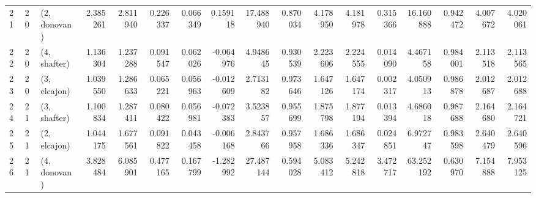 \begin{tabular}{lllrrrrrrrrrrrrrr}
21 &    20 &  (2, donovan) &  2.385261 &  2.811940 &   0.226337 &  0.066349 &  0.159118 &  17.488940 &  0.870034 &   4.178950 &  4.181978 &  0.315366 &  16.160888 &  0.942472 &  4.007672 &  4.020061 \\
22 &    20 &  (4, shafter) &  1.136304 &  1.237288 &   0.091547 &  0.062026 & -0.064976 &   4.948645 &  0.930539 &   2.223606 &  2.224555 &  0.014090 &   4.467158 &  0.984001 &  2.113518 &  2.113565 \\
23 &    20 &  (3, elcajon) &  1.039550 &  1.286633 &   0.065221 &  0.056963 & -0.012609 &   2.713182 &  0.973646 &   1.647126 &  1.647174 &  0.002317 &   4.050913 &  0.986878 &  2.012687 &  2.012688 \\
24 &    21 &  (3, shafter) &  1.100834 &  1.287411 &   0.080422 &  0.056981 & -0.072383 &   3.523857 &  0.955699 &   1.875798 &  1.877194 &  0.013394 &   4.686018 &  0.987688 &  2.164680 &  2.164721 \\
25 &    21 &  (2, elcajon) &  1.044175 &  1.677561 &   0.091822 &  0.043458 & -0.006168 &   2.843766 &  0.957958 &   1.686336 &  1.686347 &  0.024851 &   6.972747 &  0.983598 &  2.640479 &  2.640596 \\
26 &    21 &  (4, donovan) &  3.828484 &  6.085901 &   0.477165 &  0.167799 & -1.282992 &  27.487144 &  0.594028 &   5.083412 &  5.242818 &  3.472717 &  63.252192 &  0.630970 &  7.154888 &  7.953125 \\
\bottomrule
\end{tabular}

